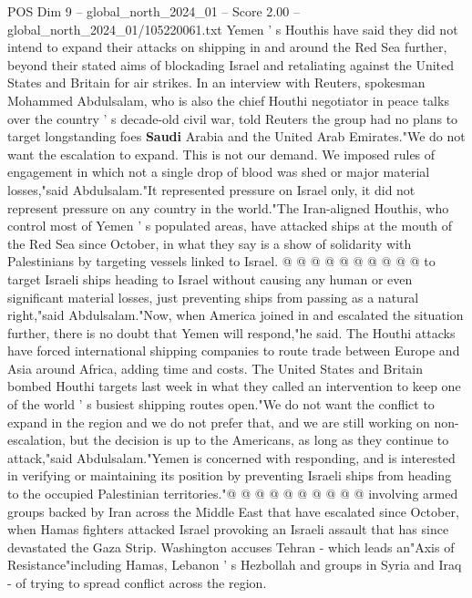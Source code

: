 \begin{textsample}{POS Dim 9 – global\_north\_2024\_01 – Score 2.00 – global\_north\_2024\_01/105220061.txt}  \label{ex:f9_pos_254}
Yemen ' s Houthis have said they did not intend to expand their attacks on shipping in and around the Red Sea further, beyond their stated aims of blockading Israel and retaliating against the United States and Britain for air strikes.
In an interview with Reuters, spokesman Mohammed Abdulsalam, who is also the chief Houthi negotiator in peace talks over the country ' s decade-old civil war, told Reuters the group had no plans to target longstanding foes \textbf{Saudi} Arabia and the United Arab Emirates."We do not want the escalation to expand.
This is not our demand.
We imposed rules of engagement in which not a single drop of blood was shed or major material losses,"said Abdulsalam."It represented pressure on Israel only, it did not represent pressure on any country in the world."The Iran-aligned Houthis, who control most of Yemen ' s populated areas, have attacked ships at the mouth of the Red Sea since October, in what they say is a show of solidarity with Palestinians by targeting vessels linked to Israel. @ @ @ @ @ @ @ @ @ @ to target Israeli ships heading to Israel without causing any human or even significant material losses, just preventing ships from passing as a natural right,"said Abdulsalam."Now, when America joined in and escalated the situation further, there is no doubt that Yemen will respond,"he said.
The Houthi attacks have forced international shipping companies to route trade between Europe and Asia around Africa, adding time and costs.
The United States and Britain bombed Houthi targets last week in what they called an intervention to keep one of the world ' s busiest shipping routes open."We do not want the conflict to expand in the region and we do not prefer that, and we are still working on non-escalation, but the decision is up to the Americans, as long as they continue to attack,"said Abdulsalam."Yemen is concerned with responding, and is interested in verifying or maintaining its position by preventing Israeli ships from heading to the occupied Palestinian territories."@ @ @ @ @ @ @ @ @ @ involving armed groups backed by Iran across the Middle East that have escalated since October, when Hamas fighters attacked Israel provoking an Israeli assault that has since devastated the Gaza Strip.
Washington accuses Tehran - which leads an"Axis of Resistance"including Hamas, Lebanon ' s Hezbollah and groups in Syria and Iraq - of trying to spread conflict across the region.

\end{textsample}

